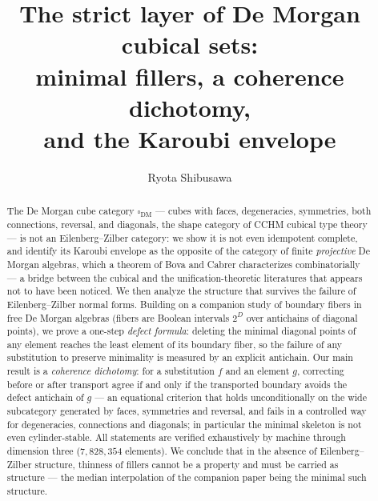 \documentclass[11pt]{amsart}
\theoremstyle{definition}
\newcommand{\cube}{\square_{\mathrm{DM}}}
\begin{document}
\title[The strict layer of De Morgan cubical sets]{The strict layer
  of De Morgan cubical sets:\\ minimal fillers, a coherence
  dichotomy,\\ and the Karoubi envelope}

\author{Ryota Shibusawa}
\address{Daiichi Institute of Technology, Japan}


\begin{abstract}
  The De Morgan cube category $\cube$ --- cubes with faces,
  degeneracies, symmetries, both connections, reversal, and
  diagonals, the shape category of CCHM cubical type theory --- is
  not an Eilenberg--Zilber category: we show it is not even
  idempotent complete, and identify its Karoubi envelope as the
  opposite of the category of finite \emph{projective} De Morgan
  algebras, which a theorem of Bova and Cabrer characterizes
  combinatorially --- a bridge between the cubical and the
  unification-theoretic literatures that appears not to have been
  noticed.  We then analyze the structure that survives the failure
  of Eilenberg--Zilber normal forms.  Building on a companion study
  of boundary fibers in free De Morgan algebras (fibers are Boolean
  intervals $2^{D}$ over antichains of diagonal points), we prove a
  one-step \emph{defect formula}: deleting the minimal diagonal
  points of any element reaches the least element of its boundary
  fiber, so the failure of any substitution to preserve minimality
  is measured by an explicit antichain.  Our main result is a
  \emph{coherence dichotomy}: for a substitution $f$ and an element
  $g$, correcting before or after transport agree if and only if the
  transported boundary avoids the defect antichain of $g$ --- an
  equational criterion that holds unconditionally on the wide
  subcategory generated by faces, symmetries and reversal, and fails
  in a controlled way for degeneracies, connections and diagonals;
  in particular the minimal skeleton is not even cylinder-stable.
  All statements are verified exhaustively by machine through
  dimension three ($7{,}828{,}354$ elements).  We conclude that in
  the absence of Eilenberg--Zilber structure, thinness of fillers
  cannot be a property and must be carried as structure --- the
  median interpolation of the companion paper being the minimal such
  structure.
\end{abstract}
\end{document}
